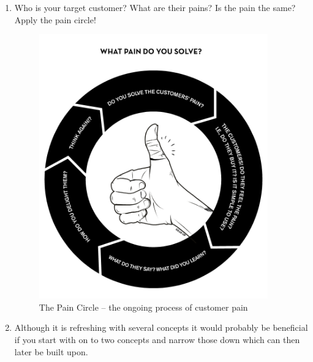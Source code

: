 \begin{enumerate}
  \item Who is your target customer? What are their pains? Is the pain the same? Apply the pain circle!

  \begin{figure}[htbp]
    \centering
      \includegraphics[height=4.5in]{../images/paincircle.png}
    \caption{The Pain Circle – the ongoing process of customer pain \protect\cite{Ramfelt}}
    \label{fig:images_paincircle}
  \end{figure}
  
  \item Although it is refreshing with several concepts it would probably be beneficial if you start with on to two concepts and narrow those down which can then later be built upon.
\end{enumerate}

